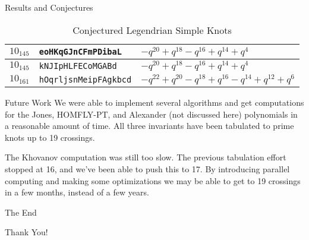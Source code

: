 \documentclass{beamer}
\begin{document}
\begin{frame}{Results and Conjectures}
\begin{table}
{\begin{tabular}{| l | l | l |}
                    \hline
                    $10_{145}$&\texttt{eoHKqGJnCFmPDibaL}&$-q^{20}+q^{18}-q^{16}+q^{14}+q^{4}$\\
                    \hline
                    $10_{145}$&\texttt{kNJIpHLFECoMGABd}&$-q^{20}+q^{18}-q^{16}+q^{14}+q^{4}$\\
                    \hline
                    $10_{161}$&\texttt{hOqrljsnMeipFAgkbcd}&$-q^{22}+q^{20}-q^{18}+q^{16}-q^{14}+q^{12}+q^{6}$\\
                    \hline
                \end{tabular}%
            }
            \caption{Conjectured Legendrian Simple Knots}
        \end{table}
    \end{frame}
    \begin{frame}{Future Work}
        We were able to implement several algorithms and get computations
        for the Jones, HOMFLY-PT, and Alexander (not discussed here)
        polynomials in a reasonable amount of time. All three invariants
        have been tabulated to prime knots up to 19 crossings.
        \par\hfill\par
        The Khovanov computation was still too slow. The previous tabulation
        effort stopped at 16, and we've been able to push this to 17. By
        introducing parallel computing and making some optimizations we may
        be able to get to 19 crossings in a few months, instead of a few years.
    \end{frame}
    \begin{frame}{The End}
        \begin{center}
            Thank You!
        \end{center}
    \end{frame}
\end{document}
